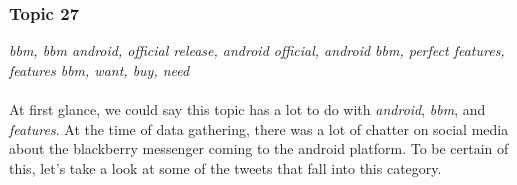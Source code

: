 \subsubsection{Topic 27}
\label{sec:topic_27}
\textit{bbm, bbm android, official release, android official, android bbm, perfect features, features bbm,
want, buy, need} \\\\
At first glance, we could say this topic has a lot to do with \textit{android}, \textit{bbm}, and
\textit{features}. At the time of data gathering, there was a lot of chatter on social media about
the blackberry messenger coming to the android platform. To be certain of this, let's take a look at
some of the tweets that fall into this category.
%
%
